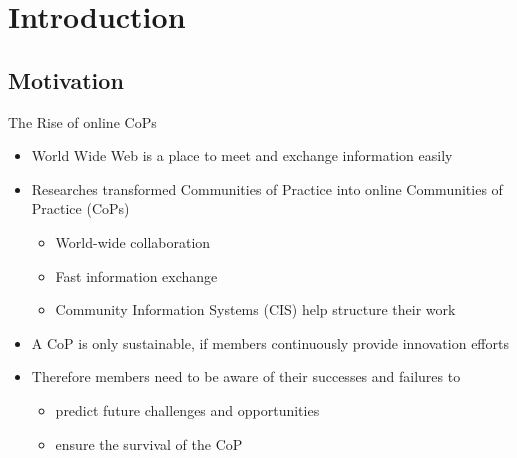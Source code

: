 \section{Introduction}

\subsection{Motivation}


\begin{frame}{The Rise of online CoPs}
  \begin{itemize}
    \item World Wide Web is a place to meet and exchange information easily
    \item Researches transformed Communities of Practice into online Communities of Practice (CoPs)
          \begin{itemize}
            \item World-wide collaboration
            \item Fast information exchange
            \item Community Information Systems (CIS) help structure their work
          \end{itemize}
    \item A CoP is only sustainable, if members continuously provide innovation efforts \cite{RKJa15}
    \item Therefore members need to be aware of their successes and failures to 
    \begin{itemize}
        \item predict future challenges and opportunities
        \item ensure the survival of the CoP
    \end{itemize}
  \end{itemize}

\end{frame}

